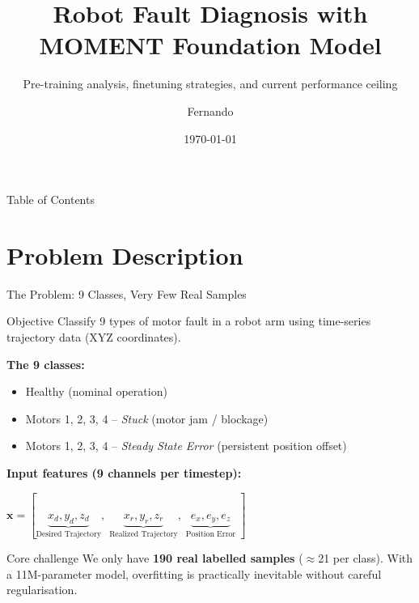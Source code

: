\documentclass{beamer}
\title[Robot Fault Diagnosis -- MOMENT]{Robot Fault Diagnosis with MOMENT Foundation Model}
\subtitle{Pre-training analysis, finetuning strategies, and current performance ceiling}
\author{Fernando}
\date{\today}
\begin{document}
\frame{\titlepage}

\begin{frame}{Table of Contents}
    \tableofcontents
\end{frame}

\section{Problem Description}

\begin{frame}{The Problem: 9 Classes, Very Few Real Samples}
    \begin{block}{Objective}
        Classify 9 types of motor fault in a robot arm using time-series trajectory data (XYZ coordinates).
    \end{block}

    \vspace{0.3cm}
    \textbf{The 9 classes:}
    \begin{itemize}
        \item Healthy (nominal operation)
        \item Motors 1, 2, 3, 4 -- \textit{Stuck} (motor jam / blockage)
        \item Motors 1, 2, 3, 4 -- \textit{Steady State Error} (persistent position offset)
    \end{itemize}

    \vspace{0.3cm}
    \textbf{Input features (9 channels per timestep):}
    \begin{center}
    $\mathbf{x} = [\underbrace{x_d, y_d, z_d}_{\text{Desired Trajectory}},\; \underbrace{x_r, y_r, z_r}_{\text{Realized Trajectory}},\; \underbrace{e_x, e_y, e_z}_{\text{Position Error}}\;]$
    \end{center}

    \vspace{0.2cm}
    \begin{alertblock}{Core challenge}
        We only have \textbf{190 real labelled samples} ($\approx$21 per class). With a 11M-parameter model, overfitting is practically inevitable without careful regularisation.
    \end{alertblock}
\end{frame}
\end{document}
